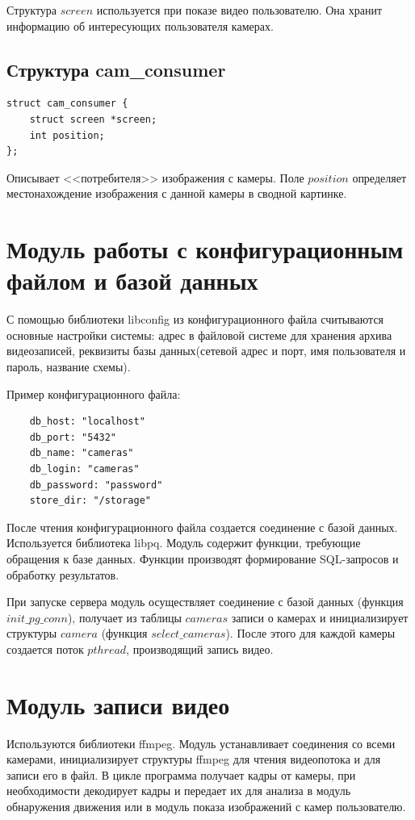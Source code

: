 Структура $screen$ используется при показе видео пользователю.
Она хранит информацию об интересующих пользователя камерах.

\subsection{Структура cam\_consumer}
\begin{verbatim}
struct cam_consumer {
    struct screen *screen;
    int position;
};
\end{verbatim}

Описывает <<потребителя>> изображения с камеры.
Поле $position$ определяет местонахождение изображения с данной камеры в сводной картинке.

\section{Модуль работы с конфигурационным файлом и базой данных}

С помощью библиотеки libconfig из конфигурационного файла считываются основные настройки системы:
адрес в файловой системе для хранения архива видеозаписей,
реквизиты базы данных(сетевой адрес и порт, имя пользователя и пароль, название схемы).

Пример конфигурационного файла:
\begin{verbatim}
	db_host: "localhost"
	db_port: "5432"
	db_name: "cameras"
	db_login: "cameras"
	db_password: "password"
	store_dir: "/storage"
\end{verbatim}

После чтения конфигурационного файла создается соединение с базой данных.
Используется библиотека libpq.
Модуль содержит функции, требующие обращения к базе данных.
Функции производят формирование SQL-запросов и обработку результатов.

При запуске сервера модуль осуществляет соединение с базой данных (функция $init\_pg\_conn$),
получает из таблицы $cameras$ записи о камерах и инициализирует структуры $camera$
(функция $select\_cameras$). После этого для каждой камеры создается поток $pthread$,
производящий запись видео.

\section{Модуль записи видео}
Используются библиотеки ffmpeg.
Модуль устанавливает соединения со всеми камерами, инициализирует структуры ffmpeg для
чтения видеопотока и для записи его в файл. В цикле программа получает кадры от камеры, при
необходимости декодирует кадры и передает их для анализа в модуль обнаружения движения
или в модуль показа изображений с камер пользователю.

